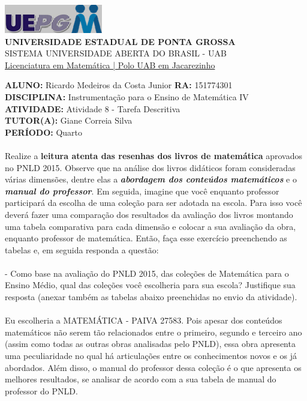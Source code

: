 \documentclass[a4paper, 12pt]{article}
\begin{document}
\begin{flushleft}\includegraphics{logo}\\
\textbf{UNIVERSIDADE ESTADUAL DE PONTA GROSSA} \\
SISTEMA UNIVERSIDADE ABERTA DO BRASIL - UAB \\
\underline{Licenciatura em Matemática | Polo UAB em Jacarezinho}\end{flushleft} 
\textbf{ALUNO:} Ricardo Medeiros da Costa Junior   \textbf{RA:} 151774301 \\
\textbf{DISCIPLINA:} Instrumentação para o Ensino de Matemática IV \\
\textbf{ATIVIDADE:} Atividade 8 - Tarefa Descritiva \\ 
\textbf{TUTOR(A):} Giane Correia Silva \\
\textbf{PERÍODO:} Quarto \\\\
Realize a \textbf{leitura atenta das resenhas dos livros de matemática} aprovados no PNLD 2015. Observe que na análise dos livros didáticos foram consideradas várias dimensões, dentre elas a \emph{ \textbf{abordagem dos conteúdos matemáticos}} e o \textbf{ \emph{manual do professor}}. Em seguida, imagine que você enquanto professor participará da escolha de uma coleção para ser adotada na escola.  Para isso você deverá fazer uma comparação dos resultados da avaliação dos livros montando uma tabela comparativa para cada dimensão e colocar a sua avaliação da obra, enquanto professor de matemática. Então, faça esse exercício preenchendo as tabelas e, em seguida responda a questão:\\\\
\indent - Como base na avaliação do PNLD 2015, das coleções de Matemática para o Ensino Médio, qual das coleções você escolheria para sua escola? Justifique sua resposta (anexar também as tabelas abaixo preenchidas no envio da atividade).\\\\
  Eu escolheria a MATEMÁTICA - PAIVA 27583. Pois apesar dos conteúdos matemáticos não serem tão relacionados entre o primeiro, segundo e terceiro ano (assim como todas as outras obras analisadas pelo PNLD), essa obra apresenta uma peculiaridade no qual há articulações entre os conhecimentos novos e os já abordados. Além disso, o manual do professor dessa coleção é o que apresenta os melhores resultados, se analisar de acordo com a sua tabela de manual do professor do PNLD.
\end{document}
